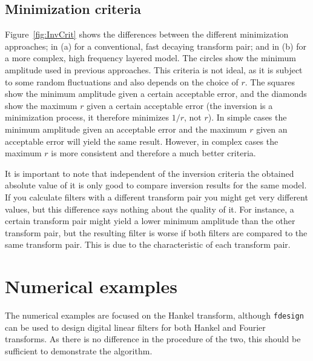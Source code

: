 \documentclass[paper,twocolumn,twoside]{geophysics}
\begin{document}
\subsection{Minimization criteria}
Figure~\ref{fig:InvCrit} shows the differences between the different
minimization approaches; in (a) for a conventional, fast decaying transform
pair; and in (b) for a more complex, high frequency layered model. The circles
show the minimum amplitude used in previous approaches. This criteria is not
ideal, as it is subject to some random fluctuations and also depends on the
choice of $r$. The squares show the minimum amplitude given a certain
acceptable error, and the diamonds show the maximum $r$ given a certain
acceptable error (the inversion is a minimization process, it therefore
minimizes $1/r$, not $r$). In simple cases the minimum amplitude given an
acceptable error and the maximum $r$ given an acceptable error will yield the
same result. However, in complex cases the maximum $r$ is more consistent and
therefore a much better criteria.
%
%

It is important to note that independent of the inversion criteria the obtained
absolute value of it is only good to compare inversion results for the same
model. If you calculate filters with a different transform pair you might get
very different values, but this difference says nothing about the quality of
it. For instance, a certain transform pair might yield a lower minimum
amplitude than the other transform pair, but the resulting filter is worse if
both filters are compared to the same transform pair. This is due to the
characteristic of each transform pair.

\section{Numerical examples}

The numerical examples are focused on the Hankel transform, although
\texttt{fdesign} can be used to design digital linear filters for both Hankel
and Fourier transforms. As there is no difference in the procedure of the two,
this should be sufficient to demonstrate the algorithm.
\end{document}
